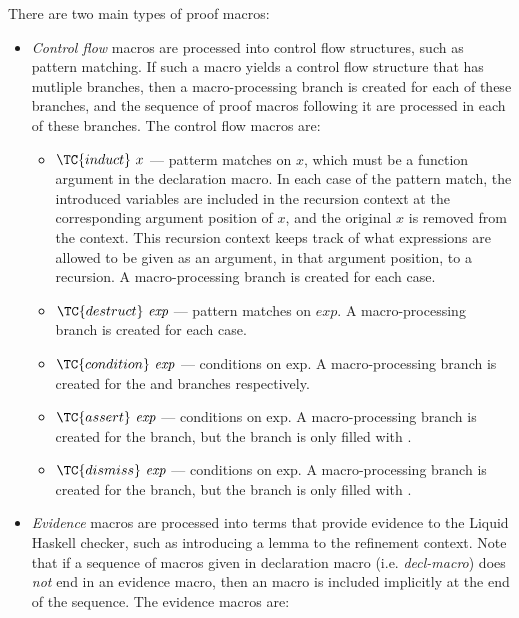 There are two main types of proof macros: 
\begin{itemize}
  \item
  \textit{Control flow} macros are processed into control flow structures, such as pattern matching. 
  If such a macro yields a control flow structure that has mutliple branches, then a macro-processing branch is created for each of these branches, and the sequence of proof macros following it are processed in each of these branches.
  The control flow macros are:
  \begin{itemize}
    \item
    $\TC{induct} ~ x$ --- patterm matches on $x$, which must be a function argument in the declaration macro.
    In each case of the pattern match, the introduced variables are included in the recursion context at the corresponding argument position of $x$, and the original $x$ is removed from the context.
    This recursion context keeps track of what expressions are allowed to be given as an argument, in that argument position, to a recursion.
    A macro-processing branch is created for each case.
    \item 
    $\TC{destruct} ~ \textit{exp}$ --- pattern matches on $\textit{exp}$. A macro-processing branch is created for each case.
    \item $\TC{condition} ~ \textit{exp}$ --- conditions on $\text{exp}$. A macro-processing branch is created for the  and  branches respectively.
    \item $\TC{assert} ~ \textit{exp}$ --- conditions on $\text{exp}$. A macro-processing branch is created for the  branch, but the  branch is only filled with .
    \item $\TC{dismiss} ~ \textit{exp}$ --- conditions on $\text{exp}$. A macro-processing branch is created for the  branch, but the  branch is only filled with .
  \end{itemize}
  \item
  \textit{Evidence} macros are processed into terms that provide evidence to the Liquid Haskell checker, such as introducing a lemma to the refinement context.
  Note that if a sequence of macros given in declaration macro (i.e. \textit{decl-macro}) does \textit{not} end in an evidence macro, then an  macro is included implicitly at the end of the sequence.
  The evidence macros are:
  \begin{itemize}

\end{itemize}
\end{itemize}
